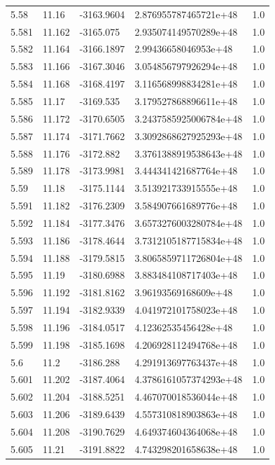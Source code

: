 \begin{tabular}{lllll}
5.58 & 11.16 & -3163.9604 & 2.876955787465721e+48 & 1.0 \\
5.581 & 11.162 & -3165.075 & 2.935074149570289e+48 & 1.0 \\
5.582 & 11.164 & -3166.1897 & 2.99436658046953e+48 & 1.0 \\
5.583 & 11.166 & -3167.3046 & 3.054856797926294e+48 & 1.0 \\
5.584 & 11.168 & -3168.4197 & 3.116568998834281e+48 & 1.0 \\
5.585 & 11.17 & -3169.535 & 3.179527868896611e+48 & 1.0 \\
5.586 & 11.172 & -3170.6505 & 3.2437585925006784e+48 & 1.0 \\
5.587 & 11.174 & -3171.7662 & 3.3092868627925293e+48 & 1.0 \\
5.588 & 11.176 & -3172.882 & 3.3761388919538643e+48 & 1.0 \\
5.589 & 11.178 & -3173.9981 & 3.444341421687764e+48 & 1.0 \\
5.59 & 11.18 & -3175.1144 & 3.513921733915555e+48 & 1.0 \\
5.591 & 11.182 & -3176.2309 & 3.584907661689776e+48 & 1.0 \\
5.592 & 11.184 & -3177.3476 & 3.6573276003280784e+48 & 1.0 \\
5.593 & 11.186 & -3178.4644 & 3.7312105187715834e+48 & 1.0 \\
5.594 & 11.188 & -3179.5815 & 3.8065859711726804e+48 & 1.0 \\
5.595 & 11.19 & -3180.6988 & 3.883484108717403e+48 & 1.0 \\
5.596 & 11.192 & -3181.8162 & 3.96193569168609e+48 & 1.0 \\
5.597 & 11.194 & -3182.9339 & 4.041972101758023e+48 & 1.0 \\
5.598 & 11.196 & -3184.0517 & 4.12362535456428e+48 & 1.0 \\
5.599 & 11.198 & -3185.1698 & 4.206928112494768e+48 & 1.0 \\
5.6 & 11.2 & -3186.288 & 4.291913697763437e+48 & 1.0 \\
5.601 & 11.202 & -3187.4064 & 4.3786161057374293e+48 & 1.0 \\
5.602 & 11.204 & -3188.5251 & 4.467070018536044e+48 & 1.0 \\
5.603 & 11.206 & -3189.6439 & 4.557310818903863e+48 & 1.0 \\
5.604 & 11.208 & -3190.7629 & 4.649374604364068e+48 & 1.0 \\
5.605 & 11.21 & -3191.8822 & 4.743298201658638e+48 & 1.0 \\

\end{tabular}
